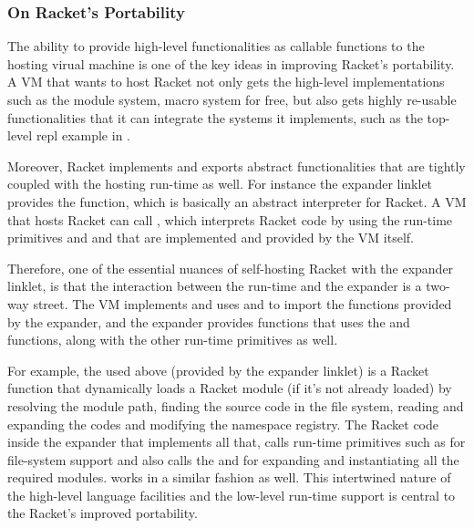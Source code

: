 \vspace{-0.25cm}

\subsubsection{On Racket's Portability}
\label{subsec:portability}

The ability to provide high-level functionalities as callable
functions to the hosting virual machine is one of the key ideas in
improving Racket's portability. A VM that wants to host Racket not
only gets the high-level implementations such as the module system,
macro system for free, but also gets highly re-usable functionalities
that it can integrate the systems it implements, such as the top-level
repl example in .

Moreover, Racket implements and exports abstract functionalities that
are tightly coupled with the hosting run-time as well. For instance
the expander linklet provides the  function, which is
basically an abstract interpreter for Racket. A VM that hosts Racket
can call , which interprets Racket code by using the
run-time primitives and 
and  that are implemented and provided
by the VM itself.

Therefore, one of the essential nuances of self-hosting Racket with
the expander linklet, is that the interaction between the run-time and
the expander is a two-way street. The VM implements and uses
 and  to
import the functions provided by the expander, and the expander
provides functions that uses the  and
 functions, along with the other
run-time primitives as well.

For example, the  used above (provided by
the expander linklet) is a Racket function that dynamically loads a
Racket module (if it's not already loaded) by resolving the module
path, finding the source code in the file system, reading and
expanding the codes and modifying the namespace registry. The Racket
code inside the expander that implements all that, calls run-time
primitives such as for file-system support and also calls the
 and  for
expanding and instantiating all the required
modules.  works in a similar fashion as well. This
intertwined nature of the high-level language facilities and the
low-level run-time support is central to the Racket's improved
portability.
